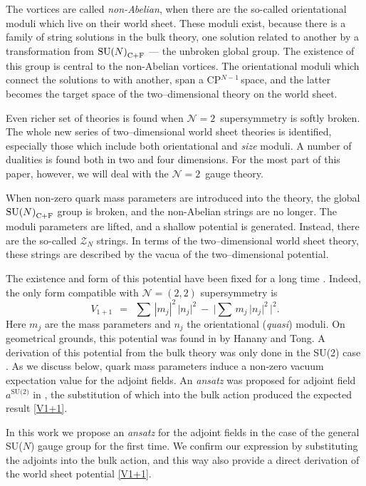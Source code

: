 \documentclass[12pt]{article}
\def\beq{\begin{equation}}
\def\eeq{\end{equation}}
\newcommand{\ntwon}{${\mathcal N}=2$}
\newcommand{\ntwot}{${\mathcal N}= \left(2,2\right) $ }
\newcommand{\mc}[1]{\mathcal{#1}}
\def\cfl {$\text{SU($N$)}_{\rm C+F}$ }
\newcommand{\cpn}{CP$^{N-1}$\,}
\newcommand{\ansatz}{{\it ansatz} }
\begin{document}
	The vortices are called {\it non-Abelian}, when there are the so-called orientational moduli which
	live on their world sheet.
	These moduli exist, because there is a family of string solutions in the bulk theory, 
	one solution related to another by a transformation from \cfl --- the unbroken global group. 
	The existence of this group is central to the non-Abelian vortices.
	The orientational moduli which connect the solutions to with another, span a \cpn space, and 
	the latter becomes the target space of the two--dimensional theory on the world sheet.

	Even richer set of theories is found when \ntwon\, supersymmetry is softly broken.
	The whole new series of two--dimensional world sheet theories is identified, 
	especially those which include both orientational and {\it size} moduli.
	A number of dualities is found  
	\cite{Shifman:2010id,Shifman:2011ka,Shifman:2012yh,Shifman:2012yi,Shifman:2013zsa}
	both in two and four dimensions.
	For the most part of this paper, however, we will deal with the \ntwon\, gauge theory.

	When non-zero quark mass parameters are introduced into the theory, 
	the global \cfl group is broken, and
	the non-Abelian strings are no longer.
	The moduli parameters are lifted, and a shallow potential is generated.
	Instead, there are the so-called $ \mc{Z}_N $ strings.
	In terms of the two--dimensional world sheet theory, these strings are described by
	the vacua of the two--dimensional potential.

	The existence and form of this potential have been fixed for a long time 
\cite{HT2,Shifman:2006bs}.
	Indeed, the only form compatible with \ntwot supersymmetry is
\beq
\label{V1+1}
	V_{1+1}    ~~=~~    \sum\, | m_j |^2\, \big| n_j \big|^2   ~-~  \Big| \sum\, m_j\, \big| n_j \big|^2 \,\Big|^2.
\eeq
	Here $ m_j $ are the mass parameters and $ n_j $ the orientational ({\it quasi}) moduli.
	On geometrical grounds, this potential was found in \cite{HT2} by Hanany and Tong. 
	A derivation of this potential from the bulk theory was only done in the SU(2) case \cite{SYmon}.
	As we discuss below, quark mass parameters induce a non-zero vacuum expectation value for the adjoint fields.
	An \ansatz was proposed for adjoint field $ a^\text{SU(2)} $ in \cite{SYmon},
	the substitution of which into the bulk action produced the expected result \eqref{V1+1}.

	In this work we propose an \ansatz for the adjoint fields in the case of the general SU($N$) gauge group for the first time.
	We confirm our expression by substituting the adjoints  into the bulk action, and this way also provide a direct
	derivation of the world sheet potential \eqref{V1+1}.
\end{document}
